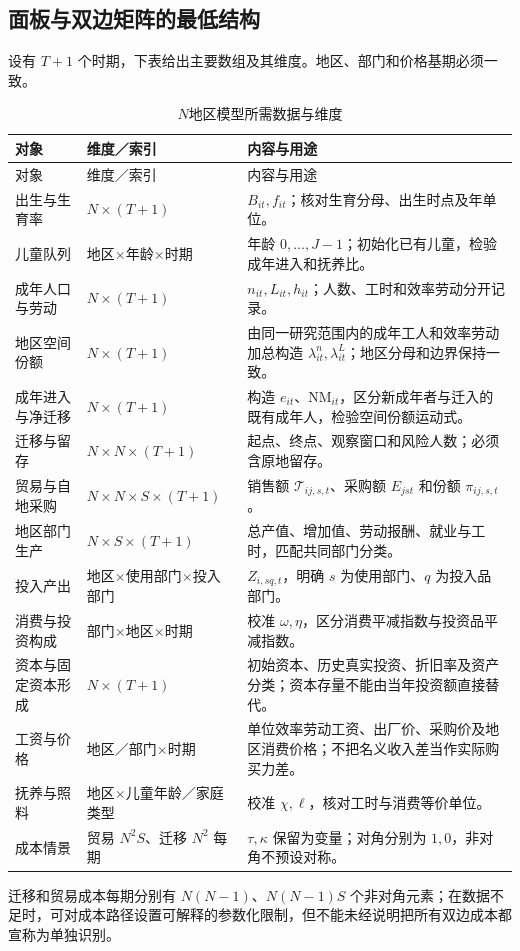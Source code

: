 \documentclass[UTF8,a4paper,zihao=-4,fontset=windows]{ctexart}
\numberwithin{equation}{section}
\begin{document}
\subsection{面板与双边矩阵的最低结构}
设有 $T+1$ 个时期，下表给出主要数组及其维度。地区、部门和价格基期必须一致。
{\small
\begin{longtable}{p{}p{}p{}}
\caption{$N$地区模型所需数据与维度}\label{tab:lg-data}\\
\toprule 对象 & 维度／索引 & 内容与用途\\\midrule\endfirsthead
\toprule 对象 & 维度／索引 & 内容与用途\\\midrule\endhead
\bottomrule\endfoot
出生与生育率 & $N\times(T+1)$ & $B_{it},f_{it}$；核对生育分母、出生时点及年单位。\\
儿童队列 & 地区$\times$年龄$\times$时期 & 年龄 $0,\ldots,J-1$；初始化已有儿童，检验成年进入和抚养比。\\
成年人口与劳动 & $N\times(T+1)$ & $n_{it},L_{it},h_{it}$；人数、工时和效率劳动分开记录。\\
地区空间份额 & $N\times(T+1)$ & 由同一研究范围内的成年工人和效率劳动加总构造 $\lambda^n_{it},\lambda^L_{it}$；地区分母和边界保持一致。\\
成年进入与净迁移 & $N\times(T+1)$ & 构造 $e_{it}$、$\mathrm{NM}_{it}$，区分新成年者与迁入的既有成年人，检验空间份额运动式。\\
迁移与留存 & $N\times N\times(T+1)$ & 起点、终点、观察窗口和风险人数；必须含原地留存。\\
贸易与自地采购 & $N\times N\times S\times(T+1)$ & 销售额 $\mathcal T_{ij,s,t}$、采购额 $E_{jst}$ 和份额 $\pi_{ij,s,t}$。\\
地区部门生产 & $N\times S\times(T+1)$ & 总产值、增加值、劳动报酬、就业与工时，匹配共同部门分类。\\
投入产出 & 地区$\times$使用部门$\times$投入部门 & $Z_{i,sq,t}$，明确 $s$ 为使用部门、$q$ 为投入品部门。\\
消费与投资构成 & 部门$\times$地区$\times$时期 & 校准 $\omega,\eta$，区分消费平减指数与投资品平减指数。\\
资本与固定资本形成 & $N\times(T+1)$ & 初始资本、历史真实投资、折旧率及资产分类；资本存量不能由当年投资额直接替代。\\
工资与价格 & 地区／部门$\times$时期 & 单位效率劳动工资、出厂价、采购价及地区消费价格；不把名义收入差当作实际购买力差。\\
抚养与照料 & 地区$\times$儿童年龄／家庭类型 & 校准 $\chi,\ell$，核对工时与消费等价单位。\\
成本情景 & 贸易 $N^2S$、迁移 $N^2$ 每期 & $\tau,\kappa$ 保留为变量；对角分别为 $1,0$，非对角不预设对称。\\
\end{longtable}}
迁移和贸易成本每期分别有 $N(N-1)$、$N(N-1)S$ 个非对角元素；在数据不足时，可对成本路径设置可解释的参数化限制，但不能未经说明把所有双边成本都宣称为单独识别。
\end{document}
